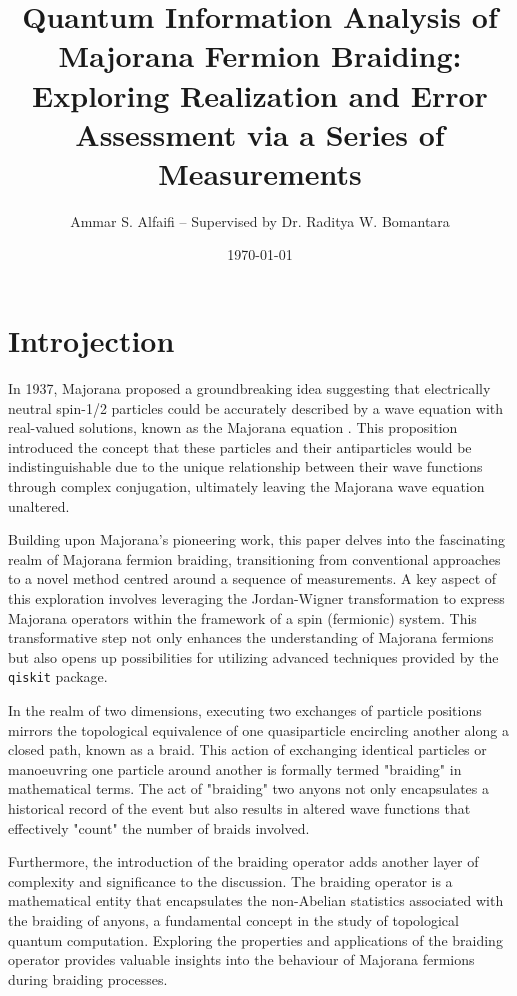 \documentclass{article}
\title{Quantum Information Analysis of Majorana Fermion Braiding: Exploring Realization and Error Assessment via a Series of Measurements}
\author{Ammar S. Alfaifi -- Supervised by Dr. Raditya W. Bomantara}
\date{\today}
\def\c#1{\texttt{#1}}
\begin{document}
\maketitle

\section{Introjection} %
In 1937, Majorana proposed a groundbreaking idea suggesting that electrically neutral spin-1/2 particles could be accurately described by a wave equation with real-valued solutions, known as the Majorana equation \cite{Majorana2006}. This proposition introduced the concept that these particles and their antiparticles would be indistinguishable due to the unique relationship between their wave functions through complex conjugation, ultimately leaving the Majorana wave equation unaltered.

Building upon Majorana's pioneering work, this paper delves into the fascinating realm of Majorana fermion braiding, transitioning from conventional approaches to a novel method centred around a sequence of measurements. A key aspect of this exploration involves leveraging the Jordan-Wigner transformation to express Majorana operators within the framework of a spin (fermionic) system. This transformative step not only enhances the understanding of Majorana fermions but also opens up possibilities for utilizing advanced techniques provided by the \c{qiskit} package.

In the realm of two dimensions, executing two exchanges of particle positions mirrors the topological equivalence of one quasiparticle encircling another along a closed path, known as a braid. This action of exchanging identical particles or manoeuvring one particle around another is formally termed "braiding" in mathematical terms. The act of "braiding" two anyons not only encapsulates a historical record of the event but also results in altered wave functions that effectively "count" the number of braids involved.\cite{Nakamura_2020}

Furthermore, the introduction of the braiding operator adds another layer of complexity and significance to the discussion. The braiding operator is a mathematical entity that encapsulates the non-Abelian statistics associated with the braiding of anyons, a fundamental concept in the study of topological quantum computation. Exploring the properties and applications of the braiding operator provides valuable insights into the behaviour of Majorana fermions during braiding processes.
\end{document}
